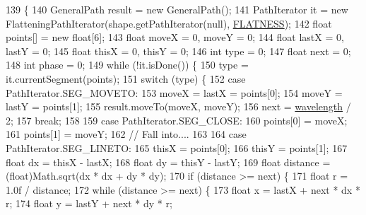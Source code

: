 \begin{DoxyCode}
139                                                       \{
140             GeneralPath result = \textcolor{keyword}{new} GeneralPath();
141             PathIterator it = \textcolor{keyword}{new} FlatteningPathIterator(shape.getPathIterator(null), 
      \mbox{\hyperlink{classorg_1_1newdawn_1_1slick_1_1font_1_1effects_1_1_outline_zigzag_effect_1_1_zigzag_stroke_a23a03ec9f7b08b39400967cb8ad91582}{FLATNESS}});
142             \textcolor{keywordtype}{float} points[] = \textcolor{keyword}{new} \textcolor{keywordtype}{float}[6];
143             \textcolor{keywordtype}{float} moveX = 0, moveY = 0;
144             \textcolor{keywordtype}{float} lastX = 0, lastY = 0;
145             \textcolor{keywordtype}{float} thisX = 0, thisY = 0;
146             \textcolor{keywordtype}{int} type = 0;
147             \textcolor{keywordtype}{float} next = 0;
148             \textcolor{keywordtype}{int} phase = 0;
149             \textcolor{keywordflow}{while} (!it.isDone()) \{
150                 type = it.currentSegment(points);
151                 \textcolor{keywordflow}{switch} (type) \{
152                 \textcolor{keywordflow}{case} PathIterator.SEG\_MOVETO:
153                     moveX = lastX = points[0];
154                     moveY = lastY = points[1];
155                     result.moveTo(moveX, moveY);
156                     next = \mbox{\hyperlink{classorg_1_1newdawn_1_1slick_1_1font_1_1effects_1_1_outline_zigzag_effect_a4393ec4437b469ea2855c70deec82d09}{wavelength}} / 2;
157                     \textcolor{keywordflow}{break};
158 
159                 \textcolor{keywordflow}{case} PathIterator.SEG\_CLOSE:
160                     points[0] = moveX;
161                     points[1] = moveY;
162                     \textcolor{comment}{// Fall into....}
163 
164                 \textcolor{keywordflow}{case} PathIterator.SEG\_LINETO:
165                     thisX = points[0];
166                     thisY = points[1];
167                     \textcolor{keywordtype}{float} dx = thisX - lastX;
168                     \textcolor{keywordtype}{float} dy = thisY - lastY;
169                     \textcolor{keywordtype}{float} distance = (float)Math.sqrt(dx * dx + dy * dy);
170                     \textcolor{keywordflow}{if} (distance >= next) \{
171                         \textcolor{keywordtype}{float} r = 1.0f / distance;
172                         \textcolor{keywordflow}{while} (distance >= next) \{
173                             \textcolor{keywordtype}{float} x = lastX + next * dx * r;
174                             \textcolor{keywordtype}{float} y = lastY + next * dy * r;

\end{DoxyCode}

